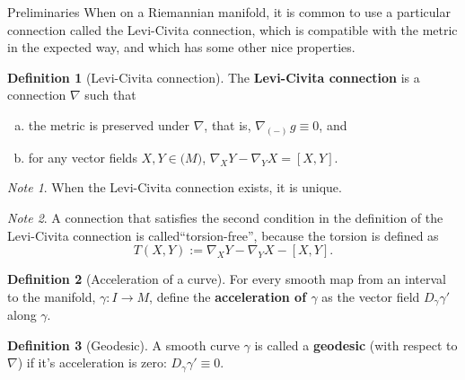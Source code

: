 \documentclass{article}
\newcommand{\fn}[3]{#1 \colon #2 \rightarrow #3}
\theoremstyle{definition}
\newtheorem{definition}{Definition}[section]
\theoremstyle{remark}
\newtheorem{remark}{Note}[section]
\begin{document}
\begin{section}{Preliminaries}
    When on a Riemannian manifold, it is common to use a particular connection
    called the Levi-Civita connection, which is compatible with the metric in
    the expected way, and which has some other nice properties.
  \begin{definition}[Levi-Civita connection]
    The \textbf{Levi-Civita connection} is a connection $\nabla$ such that
    \begin{enumerate}[(a)]
      \item the metric is preserved under $\nabla$, that is, $\nabla_{\!(-)\,}g \equiv 0$, and
      \item for any vector fields $X, Y \in \mathfrak(M)$, $\nabla_XY - \nabla_YX = [X, Y]$.
    \end{enumerate}
  \end{definition}
  \begin{remark}
    When the Levi-Civita connection exists, it is unique.
  \end{remark}
  \begin{remark}
    A connection that satisfies the second condition in the definition of the
    Levi-Civita connection is called``torsion-free'', because the torsion is
    defined as \[
      T(X, Y):= \nabla_XY - \nabla_YX - [X, Y].
    \]
  \end{remark}
  \begin{definition}[Acceleration of a curve]
   For every smooth map from an interval to the manifold, $\fn \gamma I M$,
   define the \textbf{acceleration of $\gamma$} as the vector field
   $D_\gamma  \gamma'$ along $\gamma$.
  \end{definition}

  \begin{definition}[Geodesic]
    A smooth curve $\gamma$ is called a \textbf{geodesic} (with respect to
    $\nabla$) if it's acceleration is zero: $D_\gamma \gamma' \equiv 0$.
  \end{definition}



\end{section}
\end{document}
